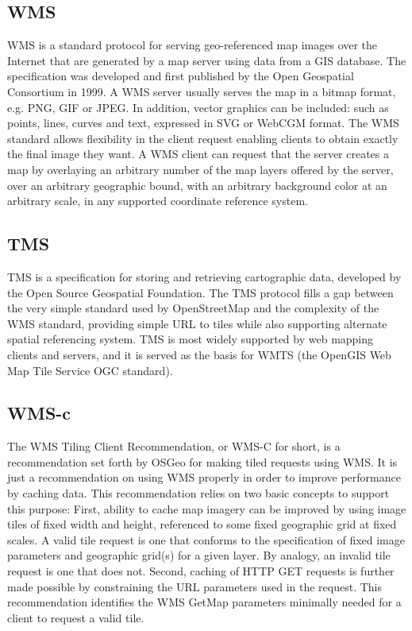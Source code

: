 \documentclass[11pt,a4paper,titlepage,oneside]{report}
\begin{document}
  \subsection{WMS}
    \acrfull{WMS} is a standard \gls{protocol} for serving geo-referenced map images over the Internet that are generated by a map server using data from a GIS database. The specification was developed and first published by the Open Geospatial Consortium in 1999.
    A \gls{WMS} server usually serves the map in a bitmap format, e.g. \gls{PNG}, \gls{GIF} or \gls{JPEG}. In addition, vector graphics can be included: such as points, lines, curves and text, expressed in SVG or WebCGM format.
    The \gls{WMS} standard allows flexibility in the client request enabling clients to obtain exactly the final image they want. A \gls{WMS} client can request that the server creates a map by overlaying an arbitrary number of the map layers offered by the server, over an arbitrary geographic bound, with an arbitrary background color at an arbitrary scale, in any supported coordinate reference system. \cite{WMS:Web}

  \subsection{TMS}
\gls{TMS} is a specification for storing and retrieving cartographic data, developed by the Open Source Geospatial Foundation. The \gls{TMS} \gls{protocol} fills a gap between the very simple standard used by OpenStreetMap and the complexity of the \gls{WMS} standard, providing simple \gls{URL} to tiles while also supporting alternate spatial referencing system.
    \gls{TMS} is most widely supported by web mapping clients and servers, and it is served as the basis for \gls{WMTS} (the OpenGIS Web Map Tile Service \gls{OGC} standard). \cite{TMS:Web}

  \subsection{WMS-c}
    The WMS Tiling Client Recommendation, or WMS-C for short, is a recommendation set forth by OSGeo for making tiled requests using \gls{WMS}. It is just a recommendation on using \gls{WMS} properly in order to improve performance by caching data.
    This recommendation relies on two basic concepts to support this purpose: First, ability to cache map imagery can be improved by using image tiles of fixed width and height, referenced to some fixed geographic grid at fixed scales. A valid tile request is one that conforms to the specification of fixed image parameters and geographic grid(s) for a given layer. By analogy, an invalid tile request is one that does not.
    Second, caching of \gls{HTTP} GET requests is further made possible by constraining the \gls{URL} parameters used in the request. This recommendation identifies the \gls{WMS} GetMap parameters minimally needed for a client to request a valid tile. \cite{WMSc:Web}
\end{document}
